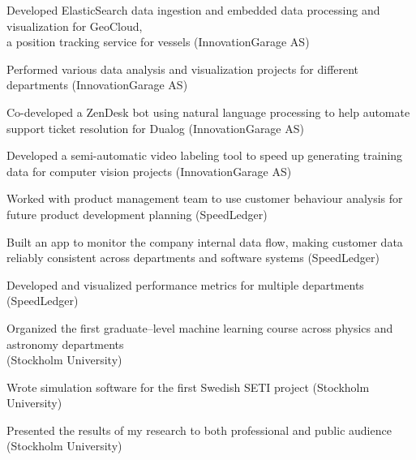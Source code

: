 
  \begin{cvitems}
    \vspace{.5\baselineskip}
        
    \item\small{Developed ElasticSearch data ingestion and embedded data processing and visualization for GeoCloud, \\
    a position tracking service for vessels (InnovationGarage AS)}

    \item\small{Performed various data analysis and visualization projects
    for different departments (InnovationGarage AS)}

    \item\small{Co-developed a ZenDesk bot using natural language processing
    to help automate support ticket resolution for Dualog (InnovationGarage AS)}
    
    \item\small{Developed a semi-automatic video labeling tool to speed up
    generating training data for computer vision projects (InnovationGarage AS)}

    \item \small{Worked with product management team to use customer behaviour analysis
    for future product development planning (SpeedLedger)}
    
    \item \small{Built an app to monitor the company internal data
      flow, making customer data reliably consistent across
      departments and software systems (SpeedLedger)}

    \item \small{Developed and visualized performance metrics for
      multiple departments (SpeedLedger)}

    \item \small{Organized the first graduate--level machine learning
      course across physics and astronomy departments \\
      (Stockholm University)}

    \item \small{Wrote simulation software for the first Swedish SETI
      project (Stockholm University)}

    \item \small{Presented the results of my research to both
      professional and public audience (Stockholm University)}


\end{cvitems}
